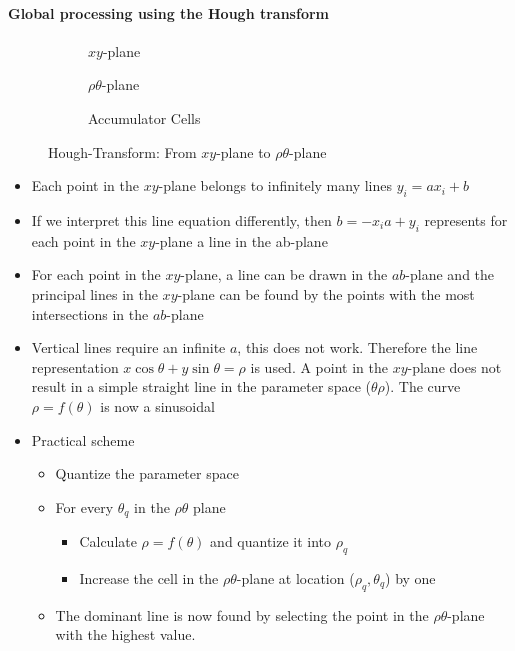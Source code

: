 \paragraph{Global processing using the Hough transform}
\begin{figure}[h]
	\centering
	\begin{subfigure}{0.3\textwidth}
		
		\caption{$xy$-plane}
	\end{subfigure}
	\begin{subfigure}{0.3\textwidth}
		
		\caption{$\rho\theta$-plane}
	\end{subfigure}
	\begin{subfigure}{0.3\textwidth}
		
		\caption{Accumulator Cells}
	\end{subfigure}
	\caption{Hough-Transform: From $xy$-plane to $\rho\theta$-plane}
\end{figure}
\begin{itemize}
\item Each point in the $xy$-plane belongs to infinitely many lines $y_i=ax_i+b$
\item If we interpret this line equation differently, then $b=-x_ia+y_i$ represents for each point in the $xy$-plane a line in the ab-plane
\item For each point in the $xy$-plane, a line can be drawn in the $ab$-plane and the principal lines in the $xy$-plane can be found by the points with the most intersections in the $ab$-plane
\item Vertical lines require an infinite $a$, this does not work. Therefore the line representation $x \cos \theta + y \sin \theta = \rho$ is used. A point in the $xy$-plane does not result in a simple straight line in the parameter space ($\theta\rho$). The curve $\rho = f(\theta)$ is now a sinusoidal
\item Practical scheme
\begin{itemize}
\item Quantize the parameter space
\item For every $\theta_q$ in the $\rho\theta$ plane
	\begin{itemize}
		\item Calculate $\rho = f(\theta)$ and quantize it into $\rho_q$
		\item Increase the cell in the $\rho\theta$-plane at location ($\rho_q, \theta_q$) by one
	\end{itemize}
\item The dominant line is now found by selecting the point in the $\rho\theta$-plane with the highest value.
\end{itemize}
\end{itemize}

